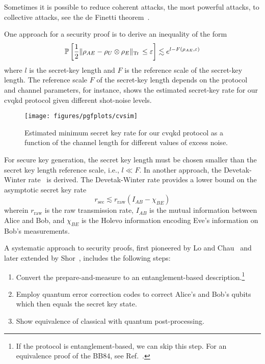 Sometimes it is possible to reduce coherent attacks, the most powerful attacks, to collective attacks, see the de Finetti theorem~\cite[p.~148]{Wolf2021}.

One approach for a security proof is to derive an inequality of the form~\cite[p.~11]{Scarani2009}
\begin{equation}
	\mathbb{P}\left[
		\frac{1}{2}
		\lVert\rho_{AE}-\rho_U\otimes\rho_E\rVert_{\operatorname{Tr}{}}
		\leq
		\varepsilon
	\right]
	\lesssim
	e^{l-F(\rho_{AE},\varepsilon)}
	\label{eq:qkd_inequality}
\end{equation}
where $l$ is the secret-key length and $F$ is the reference scale of the secret-key length.
The reference scale $F$ of the secret-key length depends on the protocol and channel parameters, for instance,  shows the estimated secret-key rate for our \gls{cvqkd} protocol given different shot-noise levels.
\begin{figure}[htb]
	\centering
	\texttt{[image: figures/pgfplots/cvsim]}
	\caption{Estimated minimum secret key rate for our \gls{cvqkd} protocol as a function of the channel length for different values of excess noise.}\label{fig:cvsim}
\end{figure}
For secure key generation, the secret key length must be chosen smaller than the secret key length reference scale, i.e., $l\ll F$.
In another approach, the Devetak-Winter rate~\cite[p.~144]{Wolf2021} is derived.
The Devetak-Winter rate provides a lower bound on the asymptotic secret key rate
\begin{equation}
	r_\text{sec}
	\lesssim
	r_\text{raw}
	(I_{AB}-\chi_{BE})
\end{equation}
wherein $r_\text{raw}$ is the raw transmission rate, $I_{AB}$ is the mutual information between Alice and Bob, and $\chi_{BE}$ is the Holevo information encoding Eve's information on Bob's measurements.

A systematic approach to security proofs, first pioneered by Lo and Chau~\cite{Lo1999} and later extended by Shor~\cite{Shor2000}, includes the following steps:
\begin{enumerate}
	\item Convert the prepare-and-measure to an entanglement-based description.\footnote{If the protocol is entanglement-based, we can skip this step. For an equivalence proof of the BB84, see Ref.~\cite[p.~106]{Wolf2021}.}
	\item Employ quantum error correction codes to correct Alice's and Bob's qubits which then equals the secret key state.
	\item Show equivalence of classical with quantum post-processing.
\end{enumerate}